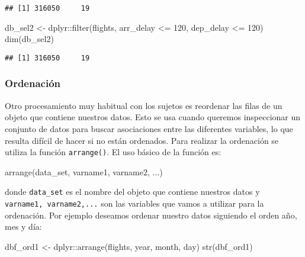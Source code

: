 \documentclass[
]{book}
\newenvironment{Shaded}{\begin{snugshade}}{\end{snugshade}}
\newcommand{\DecValTok}[1]{\textcolor[rgb]{0.00,0.00,0.81}{#1}}
\newcommand{\FunctionTok}[1]{\textcolor[rgb]{0.00,0.00,0.00}{#1}}
\newcommand{\NormalTok}[1]{#1}
\newcommand{\OtherTok}[1]{\textcolor[rgb]{0.56,0.35,0.01}{#1}}
\newcommand{\SpecialCharTok}[1]{\textcolor[rgb]{0.00,0.00,0.00}{#1}}
\begin{document}
\begin{verbatim}
## [1] 316050     19
\end{verbatim}

\begin{Shaded}
\begin{Highlighting}[]
\NormalTok{db\_sel2 }\OtherTok{\textless{}{-}}\NormalTok{ dplyr}\SpecialCharTok{::}\FunctionTok{filter}\NormalTok{(flights, arr\_delay }\SpecialCharTok{\textless{}=} \DecValTok{120}\NormalTok{, dep\_delay }\SpecialCharTok{\textless{}=} \DecValTok{120}\NormalTok{)}
\FunctionTok{dim}\NormalTok{(db\_sel2)}
\end{Highlighting}
\end{Shaded}

\begin{verbatim}
## [1] 316050     19
\end{verbatim}

\hypertarget{ordenaciuxf3n}{%
\subsubsection{Ordenación}\label{ordenaciuxf3n}}

Otro procesamiento muy habitual con los sujetos es reordenar las filas de un objeto que contiene nuestros datos. Esto se usa cuando queremos inspeccionar un conjunto de datos para buscar asociaciones entre las diferentes variables, lo que resulta difícil de hacer si no están ordenados. Para realizar la ordenación se utiliza la función \texttt{arrange()}. El uso básico de la función es:

\begin{Shaded}
\begin{Highlighting}[]
\FunctionTok{arrange}\NormalTok{(data\_set, varname1, varname2, ...)}
\end{Highlighting}
\end{Shaded}

donde \texttt{data\_set} es el nombre del objeto que contiene nuestros datos y \texttt{varname1,\ varname2,...} son las variables que vamos a utilizar para la ordenación. Por ejemplo deseamos ordenar nuestro datos siguiendo el orden año, mes y día:

\begin{Shaded}
\begin{Highlighting}[]
\NormalTok{dbf\_ord1 }\OtherTok{\textless{}{-}}\NormalTok{ dplyr}\SpecialCharTok{::}\FunctionTok{arrange}\NormalTok{(flights, year, month, day)}
\FunctionTok{str}\NormalTok{(dbf\_ord1)}
\end{Highlighting}
\end{Shaded}
\end{document}
